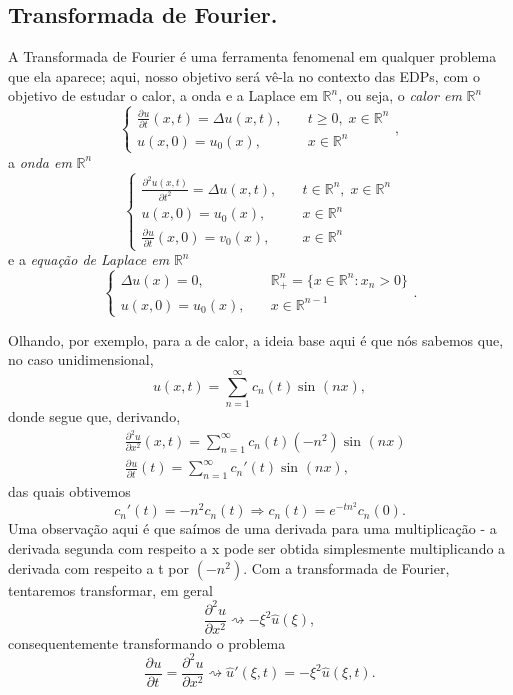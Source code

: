 \documentclass[../pde_notes.tex]{subfiles}
\begin{document}
\subsection{Transformada de Fourier.}
A Transformada de Fourier é uma ferramenta fenomenal em qualquer problema que ela aparece; aqui, nosso objetivo será vê-la no contexto das EDPs, com o objetivo de estudar o calor, a onda e a Laplace em \(\mathbb{R}^{n}\), ou seja, o \textit{calor em }\(\mathbb{R}^{n}\)
\[
	\left\{\begin{array}{ll}
		\frac{\partial^{}u}{\partial t^{}}(x, t) = \Delta u(x, t), & \quad t\geq 0,\; x\in \mathbb{R}^{n} \\
		u(x, 0) = u_{0}(x),                                        & \quad x\in \mathbb{R}^{n}
	\end{array}\right.,
\]
a \textit{onda em }\(\mathbb{R}^{n}\)
\[
	\left\{\begin{array}{ll}
		\frac{\partial^{2}u(x, t)}{\partial t^{2}}=\Delta u(x, t), & \quad t\in \mathbb{R}^{n},\; x\in \mathbb{R}^{n} \\
		u(x, 0) = u_{0}(x),                                        & \quad x\in \mathbb{R}^{n}                        \\
		\frac{\partial^{}u}{\partial t^{}}(x, 0) = v_{0}(x),       & \quad x\in \mathbb{R}^{n}
	\end{array}\right.
\]
e a \textit{equação de Laplace em }\(\mathbb{R}^{n}\)
\[
	\left\{\begin{array}{ll}
		\Delta u(x) = 0,    & \quad \mathbb{R}_{+}^{n} = \{x\in \mathbb{R}^{n}: x_{n} > 0\} \\
		u(x, 0) = u_{0}(x), & \quad x\in \mathbb{R}^{n-1}
	\end{array}\right..
\]

Olhando, por exemplo, para a de calor, a ideia base aqui é que nós sabemos que, no caso unidimensional,
\[
	u(x, t) = \sum\limits_{n=1}^{\infty}c_{n}(t)\sin^{}{(nx)},
\]
donde segue que, derivando,
\begin{align*}
	 & \frac{\partial^{2}u}{\partial x^{2}}(x, t) = \sum\limits_{n=1}^{\infty}c_{n}(t)(-n^{2})\sin^{}{(nx)} \\
	 & \frac{\partial^{}u}{\partial t^{}}(t) = \sum\limits_{n=1}^{\infty}c_{n}'(t) \sin^{}{(nx)},
\end{align*}
das quais obtivemos
\[
	c_{n}'(t) = -n^{2}c_{n}(t) \Rightarrow c_{n}(t) = e^{-tn^{2}}c_{n}(0).
\]
Uma observação aqui é que saímos de uma derivada para uma multiplicação - a derivada segunda com respeito a x pode ser obtida simplesmente multiplicando a derivada com respeito a t por \((-n^{2})\). Com a transformada de Fourier, tentaremos transformar, em geral
\[
	\frac{\partial^{2}u}{\partial x^{2}}\rightsquigarrow -\xi^{2}\hat{u}(\xi ),
\]
consequentemente transformando o problema
\[
	\frac{\partial^{}u}{\partial t^{}} = \frac{\partial^{2}u}{\partial x^{2}} \rightsquigarrow \hat{u}'(\xi, t ) = -\xi^{2}\hat{u}(\xi , t).
\]
\end{document}
